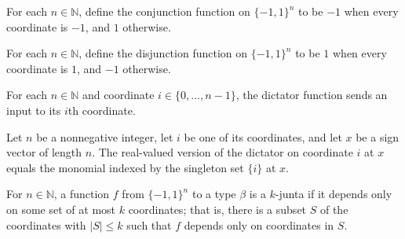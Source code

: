 \begin{definition}
\label{FABL.andFunction}
\leanok
{}
For each $n\in\mathbb N$, define the conjunction function on $\{-1,1\}^n$ to be $-1$
when every coordinate is $-1$, and $1$ otherwise.
\end{definition}

\begin{definition}
\label{FABL.orFunction}
\leanok
{}
For each $n\in\mathbb N$, define the disjunction function on $\{-1,1\}^n$ to be $1$ when
every coordinate is $1$, and $-1$ otherwise.
\end{definition}

\begin{definition}
\label{FABL.dictator}
\leanok
{}
For each $n\in\mathbb N$ and coordinate $i\in\{0,\ldots,n-1\}$, the dictator function
sends an input to its $i$th coordinate.
\end{definition}

\begin{theorem}
\label{FABL.dictator_toReal_eq_monomial_singleton}
\leanok
{}
Let $n$ be a nonnegative integer, let $i$ be one of its coordinates, and let $x$ be a
sign vector of length $n$. The real-valued version of the dictator on coordinate $i$ at
$x$ equals the monomial indexed by the singleton set $\{i\}$ at $x$.
\end{theorem}

\begin{definition}
\label{FABL.IsKJunta}
\leanok
For $n\in\mathbb N$, a function $f$ from $\{-1,1\}^n$ to a type $\beta$ is a $k$-junta
if it depends only on some set of at most $k$ coordinates; that is, there is a subset
$S$ of the coordinates with $|S|\le k$ such that $f$ depends only on coordinates in $S$.
\end{definition}

